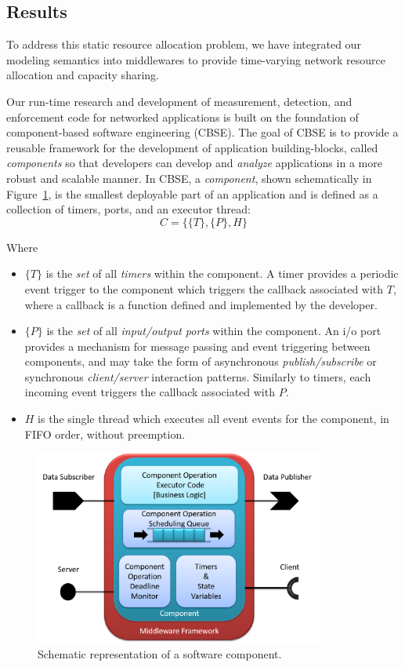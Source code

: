 \subsection{Results}
To address this static resource allocation problem, we have integrated
our modeling semantics into middlewares to provide time-varying
network resource allocation and capacity sharing.

Our run-time research and development of measurement, detection, and
enforcement code for networked applications is built on the foundation
of component-based software engineering (CBSE).  The goal of CBSE is
to provide a reusable framework for the development of application
building-blocks, called \emph{components} so that developers can develop
and \emph{analyze} applications in a more robust and scalable manner.  In
CBSE, a \emph{component}, shown schematically in
Figure~\ref{fig:component}, is the smallest deployable part of an
application and is defined as a collection of timers, ports, and an
executor thread:
\begin{equation}
  C = \{\{T\},\{P\},H\}
\end{equation}

Where

\begin{itemize}
\item $\{T\}$ is the \emph{set} of all \emph{timers} within the component.  A
  timer provides a periodic event trigger to the component which
  triggers the callback associated with $T$, where a callback is a
  function defined and implemented by the developer.  
\item $\{P\}$ is the \emph{set} of all \emph{input/output ports} within the
  component.  An i/o port provides a mechanism for message passing and
  event triggering between components, and may take the form of
  asynchronous \emph{publish/subscribe} or synchronous \emph{client/server}
  interaction patterns.  Similarly to timers, each incoming event
  triggers the callback associated with $P$.
\item $H$ is the single thread which executes all event events for
  the component, in FIFO order, without preemption.  
\end{itemize}

\begin{figure}[ht!]
  \centering
  \includegraphics[width=0.85\textwidth]{figs/ros_component.png}
  \caption{Schematic representation of a software component.}
  \label{fig:component}
\end{figure}

